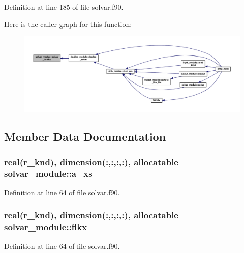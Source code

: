 Definition at line 185 of file solvar.\-f90.



Here is the caller graph for this function\-:\nopagebreak
\begin{figure}[H]
\begin{center}
\leavevmode
\includegraphics[width=350pt]{classsolvar__module_a82566cdad67c6fc8e9bc443020b1a825_icgraph}
\end{center}
\end{figure}




\subsection{Member Data Documentation}
\hypertarget{classsolvar__module_a477d603284b13595b11387b21d728dfa}{
\subsubsection[{a\-\_\-xs}]{\setlength{\rightskip}{0pt plus 5cm}real(r\-\_\-knd), dimension(\-:,\-:,\-:,\-:), allocatable solvar\-\_\-module\-::a\-\_\-xs}}\label{classsolvar__module_a477d603284b13595b11387b21d728dfa}


Definition at line 64 of file solvar.\-f90.

\hypertarget{classsolvar__module_a84eaccfc41511c5cd088f7d03d5f41c1}{
\subsubsection[{flkx}]{\setlength{\rightskip}{0pt plus 5cm}real(r\-\_\-knd), dimension(\-:,\-:,\-:,\-:), allocatable solvar\-\_\-module\-::flkx}}\label{classsolvar__module_a84eaccfc41511c5cd088f7d03d5f41c1}


Definition at line 64 of file solvar.\-f90.

